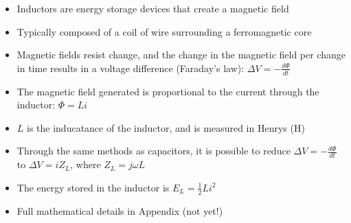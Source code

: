\begin{itemize}
\item Inductors are energy storage devices that create a magnetic field
\item Typically composed of a coil of wire surrounding a ferromagnetic core
\item Magnetic fields resist change, and the change in the magnetic field per change in time results in a voltage difference (Faraday's law): $\Delta V = -\frac{d \Phi}{d t}$
\item The magnetic field generated is proportional to the current through the inductor: $\Phi = Li$
\item $L$ is the inducatance of the inductor, and is measured in Henrys (H)
\item Through the same methods as capacitors, it is possible to reduce $\Delta V = -\frac{d \Phi}{d t}$ to $\Delta V = i Z_L$, where $Z_L=j\omega L$
\item The energy stored in the inductor is $E_L=\frac{1}{2}Li^2$
\item Full mathematical details in Appendix (not yet!)
\end{itemize}
